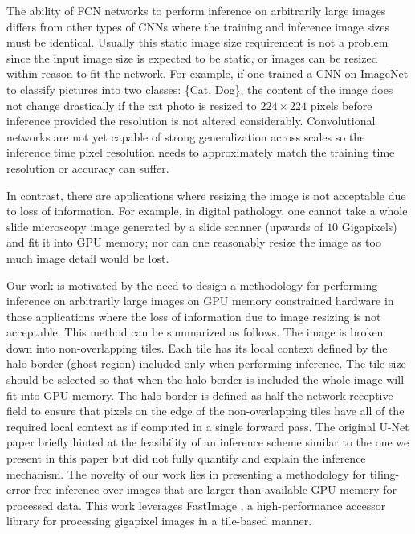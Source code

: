 \documentclass[10pt, indentfirst]{article}
\begin{document}
The ability of FCN networks to perform inference on arbitrarily large images differs from other types of CNNs where the training and inference image sizes must be identical. Usually this static image size requirement is not a problem since the input image size is expected to be static, or images can be resized within reason to fit the network. For example, if one trained a CNN on ImageNet \citep{Russakovsky2015} to classify pictures into two classes: \{Cat, Dog\}, the content of the image does not change drastically if the cat photo is resized to $224 \times 224$ pixels before inference provided the resolution is not altered considerably. Convolutional networks are not yet capable of strong generalization across scales \citep{Jaderberg2015,Lin2017a} so the inference time pixel resolution needs to approximately match the training time resolution or accuracy can suffer.

In contrast, there are applications where resizing the image is not acceptable due to loss of information. For example, in digital pathology, one cannot take a whole slide microscopy image generated by a slide scanner (upwards of $\num{10}$ Gigapixels) and fit it into GPU memory; nor can one reasonably resize the image as too much image detail would be lost. 

Our work is motivated by the need to design a methodology for performing inference on arbitrarily large images on GPU memory constrained hardware in those applications where the loss of information due to image resizing is not acceptable. This method can be summarized as follows. 
The image is broken down into non-overlapping tiles. Each tile has its local context defined by the halo border (ghost region) included only when performing inference. The tile size should be selected so that when the halo border is included the whole image will fit into GPU memory. The halo border is defined as half the network receptive field to ensure that pixels on the edge of the non-overlapping tiles have all of the required local context as if computed in a single forward pass.
The original U-Net paper \citep{Ronneberger2015a} briefly hinted at the feasibility of an inference scheme similar to the one we present in this paper but did not fully quantify and explain the inference mechanism. 
The novelty of our work lies in presenting a methodology for tiling-error-free inference over images that are larger than available GPU memory for processed data. This work leverages FastImage \citep{Bardakoff2019}, a high-performance accessor library for processing gigapixel images in a tile-based manner.
\end{document}

